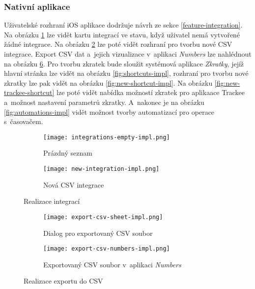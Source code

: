 \subsubsection{Nativní aplikace}

Uživatelské rozhraní iOS aplikace dodržuje návrh ze sekce \ref{feature-integration}. Na obrázku \ref{fig:integrations-empty-impl} lze vidět kartu integrací ve stavu, když uživatel nemá vytvořené žádné integrace. Na obrázku \ref{fig:new-integration-impl} lze poté vidět rozhraní pro tvorbu nové CSV integrace. Export CSV dat a~jejich vizualizace v~aplikaci \emph{Numbers} lze nahlédnout na obrázku \ref{fig:export-csv-impl}. Pro tvorbu zkratek bude sloužit systémová aplikace \emph{Zkratky}, jejíž hlavní stránka lze vidět na obrázku \ref{fig:shortcuts-impl}, rozhraní pro tvorbu nové zkratky lze pak vidět na obrázku \ref{fig:new-shortcut-impl}. Na obrázku \ref{fig:new-trackee-shortcut} lze poté vidět nabídka možností zkratek pro aplikaace Trackee a~možnost nastavení parametrů zkratky. A~nakonec je na obrázku \ref{fig:automations-impl} vidět možnost tvorby automatizací pro operace s~časovačem.

\begin{figure}[p]
    \centering
    \begin{subfigure}[b]{0.4\textwidth}
		\centering
		\texttt{[image: integrations-empty-impl.png]}
		\caption{Prázdný seznam}
		\label{fig:integrations-empty-impl}
	\end{subfigure}
	\hspace{2cm}
	\begin{subfigure}[b]{0.4\textwidth}
		\centering
		\texttt{[image: new-integration-impl.png]}
		\caption{Nová CSV integrace}
		\label{fig:new-integration-impl}
	\end{subfigure}
	\caption{Realizace integrací}
	\label{fig:integrations-impl}
\end{figure}

\begin{figure}[p]
    \centering
    \begin{subfigure}[b]{0.4\textwidth}
		\centering
		\texttt{[image: export-csv-sheet-impl.png]}
		\caption{Dialog pro exportovaný CSV soubor}
		\label{fig:export-csv-sheet-impl}
	\end{subfigure}
	\hspace{2cm}
	\begin{subfigure}[b]{0.4\textwidth}
		\centering
		\texttt{[image: export-csv-numbers-impl.png]}
		\caption{Exportovaný CSV soubor v~aplikaci \emph{Numbers}}
		\label{fig:export-csv-numbers-impl}
	\end{subfigure}
	\caption{Realizace exportu do CSV}
	\label{fig:export-csv-impl}
\end{figure}

